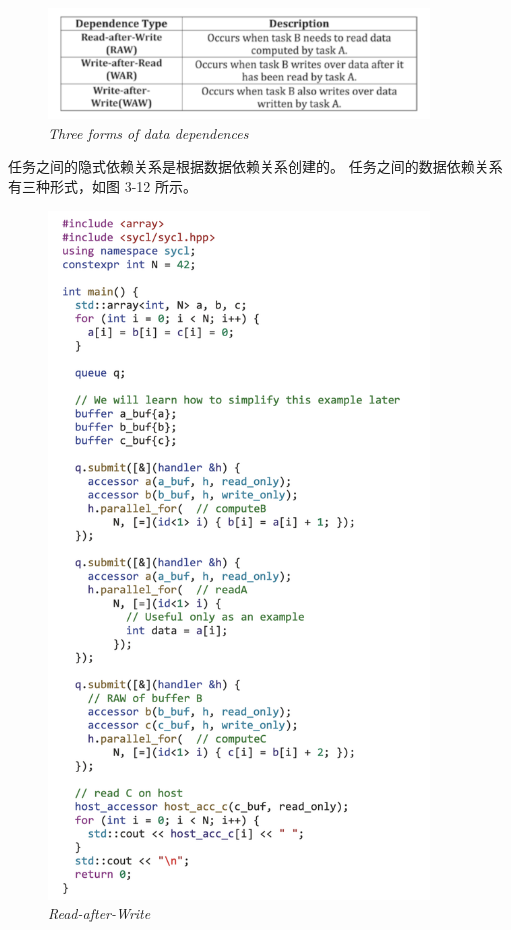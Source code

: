\begin{figure}[H]
	\centering
	\includegraphics[width=0.9\textwidth]{figs/F3.12.png}
	\caption{\textit{Three forms of data dependences}}
\end{figure}

任务之间的隐式依赖关系是根据数据依赖关系创建的。 任务之间的数据依赖关系有三种形式，如图 3-12 所示。

\begin{figure}[H]
	\centering
	\includegraphics[width=0.9\textwidth]{figs/F3.13.png}
	\caption{\textit{Read-after-Write}}
\end{figure}

